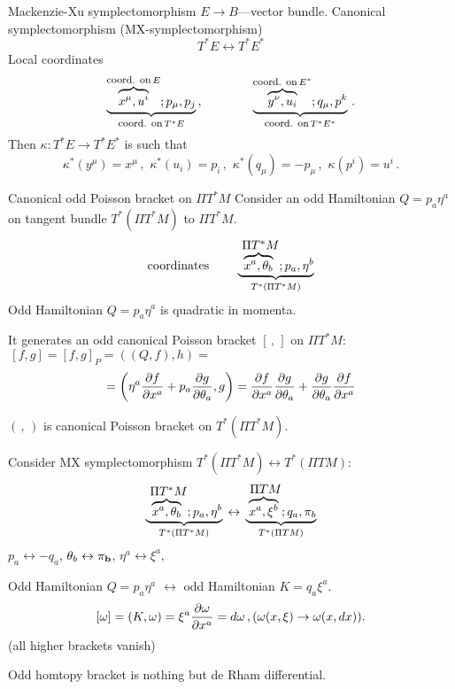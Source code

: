 \documentclass{beamer}
\def\w {{\omega}}
\def\p{\partial}
\def\p {\partial}
\def\b {{\bf b}}
\begin{document}
\begin{frame}{Mackenzie-Xu symplectomorphism}
   $E\to B$---vector bundle.   Canonical symplectomorphism 
 (MX-symplectomorphism)
               $$
     T^*E\leftrightarrow T^*E^*
               $$
Local coordinates  
               $$
             \underbrace
                {
     \overbrace{x^\mu, u^i}^{\hbox {\footnotesize coord. on}\, E}; 
           p_\mu, p_j
                }
              _{\hbox {\footnotesize coord. on}\, T^*E}\,,
   \qquad\qquad
             \underbrace
                {
     \overbrace{y^\nu, u_i}^{\hbox {\footnotesize coord. on}\, E^*}; 
           q_\mu, p^k
                }
              _{\hbox {\footnotesize coord. on}\, T^*E^*}\,.
               $$
Then $\kappa\colon T^*E\to T^*E^*$ is such that
           $$
\kappa^*(y^\mu)=x^\mu\,,\,\,
\kappa^*(u_i)=p_i\,,\,\,
\kappa^*(q_\mu)=-p_\mu\,,\,\,
 \kappa(p^i)=u^i\,. 
           $$
\end{frame}
\begin{frame}{Canonical odd Poisson bracket on $\Pi T^*M$}
Consider an odd Hamiltonian  $Q=p_a\eta^a$ 
on tangent bundle $T^*(\Pi T^*M)$ to $\Pi T^*M$.
                       $$
 {\rm coordinates}\,\qquad
  \underbrace {
    \overbrace{x^a,\theta_b}^{\hbox{ $\Pi T^*M$}}; 
 p_a,\eta^b 
       }_{T^*(\Pi T^*M)}
                       $$
Odd Hamiltonian $Q=p_a\eta^a$ is quadratic in momenta.

   It generates an odd canonical Poisson bracket $[\,,\,]$ 
on $\Pi T^*M$:
        $\,[f,g]=[f,g]_P=\left(\left(Q,f\right),h\right)=$  
                  $$
=\left(\eta^a{\p f\over \p x^a}+p_a{\p g\over \p \theta_a} ,g\right)
={\p f\over \p x^a}{\p g\over \p \theta_a}+
 {\p g\over \p \theta_a}{\p f\over \p x^a}
                   $$

$(\,,\,)$ is canonical Poisson bracket on $T^*(\Pi T^*M)$.

\end{frame}
\begin{frame} Consider MX symplectomorphism
  $T^*(\Pi T^*M)\leftrightarrow T^*(\Pi TM)$:
       $$
   \underbrace {
    \overbrace{x^a,\theta_b}^{\hbox{ $\Pi T^*M$}}; 
  p_a,\eta^b 
       }_{T^*(\Pi T^*M)}
     \,\leftrightarrow\,
        \underbrace {
    \overbrace{x^a,\xi^b}^{\hbox{ $\Pi TM$}}; 
 q_a,\pi_b 
       }_{T^*(\Pi TM)}
       $$
   $p_a\leftrightarrow -q_a$, $\theta_b\leftrightarrow \pi_\b$,
   $\eta^a\leftrightarrow \xi^a$, 
 
Odd Hamiltonian $Q=p_a\eta^a$
$\leftrightarrow$  odd Hamiltonian 
       $ K=q_a\xi^a$. 
      $$
 [\w]=(K,\w)=\xi^a{\p \w\over \p x^a}=d\w\,,(\w(x,\xi)\to \w(x,dx)).
      $$
(all higher brackets vanish)

Odd homtopy bracket is nothing but de Rham differential.
\end{frame}
\end{document}

